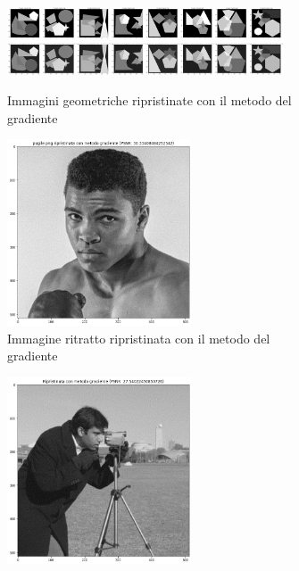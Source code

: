 \begin{figure}[H]
    \centering
    \begin{subfigure}{0.9\textwidth}
        \centering
    \includegraphics[width=0.9\textwidth]{imgRel/datasetgradiente.png}\label{fig:geomgradiente}
    \caption{Immagini geometriche ripristinate con il metodo del gradiente}
    \end{subfigure}

    \begin{subfigure}{0.5\textwidth}
        \centering
        \includegraphics[width=0.6\textwidth]{imgRel/fotogrmg.png}
        \caption{Immagine ritratto ripristinata con il metodo del gradiente}
        \label{fig: pugilemg1}
    \end{subfigure}%
    \begin{subfigure}{0.5\textwidth}\centering
        \includegraphics[width=0.6\textwidth]{MANCANTI/cameramanPuntoDueGrad.png}

\end{subfigure}
\end{figure}
